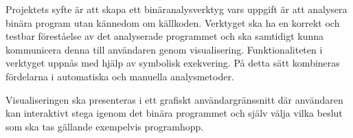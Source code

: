 Projektets syfte är att skapa ett binäranalysverktyg vars uppgift är att
analysera binära program utan kännedom om källkoden. Verktyget ska ha en
korrekt och testbar föreståelse av det analyserade programmet och ska samtidigt
kunna kommunicera denna till användaren genom visualisering. Funktionaliteten i
verktyget uppnås med hjälp av symbolisk exekvering. På detta sätt kombineras
fördelarna i automatiska och manuella analysmetoder.

Visualiseringen ska presenteras i ett grafiskt användargränssnitt där användaren
kan interaktivt stega igenom det binära programmet och själv välja vilka beslut
som ska tas gällande exempelvis programhopp.

